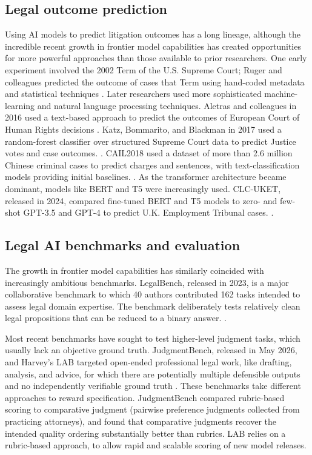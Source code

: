 \documentclass[11pt]{article}
\begin{document}
\subsection{Legal outcome prediction}
Using AI models to predict litigation outcomes has a long lineage, although the incredible recent growth in frontier model capabilities has created opportunities for more powerful approaches than those available to prior researchers. One early experiment involved the 2002 Term of the U.S. Supreme Court; Ruger and colleagues predicted the outcome of cases that Term using hand-coded metadata and statistical techniques \citep{ruger}. Later researchers used more sophisticated machine-learning and natural language processing techniques. Aletras and colleagues in 2016 used a text-based approach to predict the outcomes of European Court of Human Rights decisions \citep{aletras}. Katz, Bommarito, and Blackman in 2017 used a random-forest classifier over structured Supreme Court data to predict Justice votes and case outcomes. \citep{katz}. CAIL2018 used a dataset of more than 2.6 million Chinese criminal cases to predict charges and sentences, with text-classification models providing initial baselines. \citep{cail}. As the transformer architecture became dominant, models like BERT and T5 were increasingly used. CLC-UKET, released in 2024, compared fine-tuned BERT and T5 models to zero- and few-shot GPT-3.5 and GPT-4 to predict U.K. Employment Tribunal cases. \citep{clcuket}.

\subsection{Legal AI benchmarks and evaluation}
The growth in frontier model capabilities has similarly coincided with increasingly ambitious benchmarks. LegalBench, released in 2023, is a major collaborative benchmark to which 40 authors contributed 162 tasks intended to assess legal domain expertise. The benchmark deliberately tests relatively clean legal propositions that can be reduced to a binary answer. \citep{legalbench}.

Most recent benchmarks have sought to test higher-level judgment tasks, which usually lack an objective ground truth. JudgmentBench, released in May 2026, and Harvey's LAB targeted open-ended professional legal work, like drafting, analysis, and advice, for which there are potentially multiple defensible outputs and no independently verifiable ground truth \citep{harveyLAB,judgmentbench}. These benchmarks take different approaches to reward specification. JudgmentBench compared rubric-based scoring to comparative judgment (pairwise preference judgments collected from practicing attorneys), and found that comparative judgments recover the intended quality ordering substantially better than rubrics. LAB relies on a rubric-based approach, to allow rapid and scalable scoring of new model releases.
\end{document}
